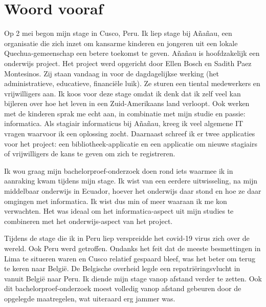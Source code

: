 
\chapter*{Woord vooraf}
\label{ch:voorwoord}


Op 2 mei begon mijn stage in Cusco, Peru. Ik liep stage bij Añañau, een organisatie die zich inzet om kansarme kinderen en jongeren uit een lokale Quechua-gemeenschap een betere toekomst te geven. Añañau is hoofdzakelijk een onderwijs project. Het project werd opgericht door Ellen Bosch en Sadith Paez Montesinos. Zij staan vandaag in voor de dagdagelijkse werking (het administratieve, educatieve, financiële luik). Ze sturen een tiental medewerkers en vrijwilligers aan. Ik koos voor deze stage omdat ik denk dat ik zelf veel kan bijleren over hoe het leven in een Zuid-Amerikaans land verloopt. Ook werken met de kinderen sprak me echt aan, in combinatie met mijn studie en passie: informatica. Als stagiair informaticus bij Añañau, kreeg ik veel algemene IT vragen waarvoor ik een oplossing zocht. Daarnaast schreef ik er twee applicaties voor het project: een bibliotheek-applicatie en een applicatie om nieuwe stagiairs of vrijwilligers de kans te geven om zich te registreren. 

Ik wou graag mijn bachelorproef-onderzoek doen rond iets waarmee ik in aanraking kwam tijdens mijn stage. Ik wist van een eerdere uitwisseling, na mijn middelbaar onderwijs in Ecuador, hoever het onderwijs daar stond en hoe ze daar omgingen met informatica. Ik wist dus min of meer waaraan ik me kon verwachten. Het was ideaal om het informatica-aspect uit mijn studies te combineren met het onderwijs-aspect van het project. 

Tijdens de stage die ik in Peru liep verspreidde het covid-19 virus zich over de wereld. Ook Peru werd getroffen. Ondanks het feit dat de meeste besmettingen in Lima te situeren waren en Cusco relatief gespaard bleef, was het beter om terug te keren naar België. De Belgische overheid legde een repatriëringsvlucht in vanuit België naar Peru. Ik diende mijn stage vanop afstand verder te zetten. Ook dit bachelorproef-onderzoek moest volledig vanop afstand gebeuren door de opgelegde maatregelen, wat uiteraard erg jammer was.

